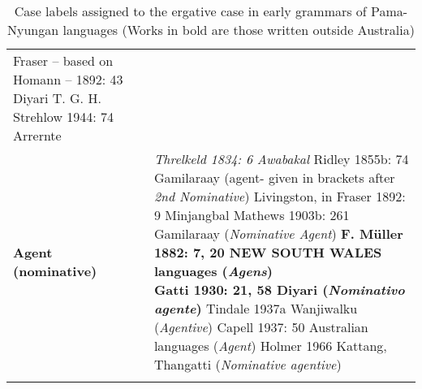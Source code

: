 \begin{table}
\begin{tabularx}{\textwidth}{Qp{9cm}}
                                \newline Fraser – based on Homann – 1892: 43 Diyari
                                \newline T. G. H. Strehlow 1944: 74 Arrernte \\
\tablevspace
        \textbf{Agent \newline (nominative)} &	\textit{Threlkeld 1834: 6 Awabakal}
                                        \newline Ridley 1855b: 74 Gamilaraay (agent- given in brackets after \textit{2nd Nominative})
                                        \newline Livingston, in Fraser 1892: 9 Minjangbal
                                        \newline Mathews 1903b: 261 Gamilaraay (\textit{Nominative Agent})
                                        \newline \textbf{F. Müller 1882: 7, 20 NEW SOUTH WALES languages (\textit{Agens})
                                        \newline Gatti 1930: 21, 58 Diyari (\textit{Nominativo agente})}
                                        \newline Tindale 1937a Wanjiwalku (\textit{Agentive})
                                        \newline Capell 1937: 50 Australian languages (\textit{Agent})
                                        \newline Holmer 1966 Kattang, Thangatti (\textit{Nominative agentive}) \\
	\lspbottomrule
    \end{tabularx}
	\caption{Case labels assigned to the ergative case in early grammars of Pama-Nyungan languages (Works in bold are those written outside Australia)}
	\label{tab:chap3:ergativepm}
\end{table}

